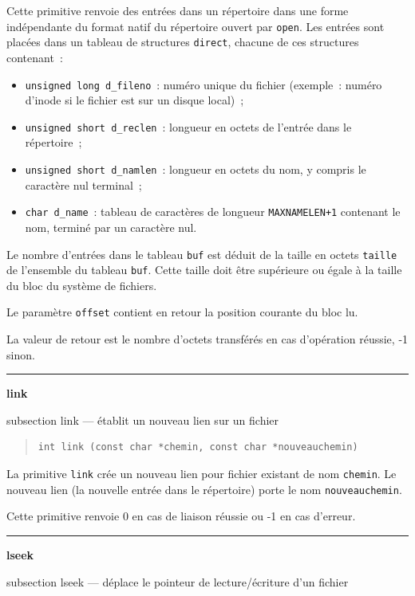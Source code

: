 \documentclass [twoside] {report}
\newcommand {\primitive} [1]
    {
	\phantomsection
	{\large \textbf {#1}}
	\addcontentsline {toc} {subsection} {#1}
    }
\newcommand {\separation}
    {
	\vspace {5mm}
	\nopagebreak
	\hrule
    }
\begin{document}
Cette primitive renvoie des entrées dans un répertoire dans une
forme indépendante du format natif du répertoire ouvert par \texttt {open}.
Les entrées sont placées dans un tableau de structures \texttt {direct},
chacune de ces structures contenant~:

\begin {itemize}
    \item \texttt {unsigned long d\_fileno}~:  numéro unique du fichier
	(exemple~:  numéro d'inode si le fichier est sur un disque
	local)~;
    \item \texttt {unsigned short d\_reclen}~: longueur en octets de l'entrée
	dans le répertoire~;
    \item \texttt {unsigned short d\_namlen}~: longueur en octets du nom, y
	compris le caractère nul terminal~;
    \item \texttt {char d\_name}~: tableau de caractères de longueur
	\texttt {MAXNAMELEN+1} contenant le nom, terminé par un
	caractère nul.

\end {itemize}

Le nombre d'entrées dans le tableau \texttt {buf} est déduit de la taille en
octets \texttt {taille} de l'ensemble du tableau \texttt {buf}. Cette taille
doit être supérieure ou égale à la taille du bloc du système de
fichiers.

Le paramètre \texttt {offset} contient en retour la position courante du bloc
lu.

La valeur de retour est le nombre d'octets transférés en cas d'opération
réussie, -1 sinon.


\separation
\primitive {link} --- établit un nouveau lien sur un fichier

\begin {quote}
\begin {verbatim}
int link (const char *chemin, const char *nouveauchemin)
\end{verbatim}
\end {quote}

La primitive \texttt {link} crée un nouveau lien pour
fichier existant de nom \texttt {chemin}. Le nouveau lien
(la nouvelle entrée dans le répertoire) porte
le nom \texttt {nouveauchemin}.

Cette primitive renvoie 0 en cas de liaison
réussie ou -1 en cas d'erreur.




\separation
\primitive {lseek} --- déplace le pointeur de lecture/écriture d'un fichier
    \label {lseek}
\end{document}
